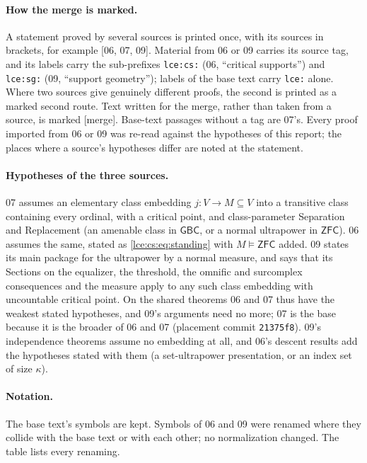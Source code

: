 \documentclass[11pt,letterpaper]{article}
\numberwithin{equation}{section}
\theoremstyle{definition}
\theoremstyle{remark}
\newcommand{\ZFC}{\mathsf{ZFC}}
\newcommand{\GBC}{\mathsf{GBC}}
\newcommand{\src}[1]{\textup{\textsf{\small[#1]}}}%
\newcommand{\mergetag}{\textup{\textsf{\small[merge]}}}%
\begin{document}
\paragraph{How the merge is marked.} A statement proved by several sources is
printed once, with its sources in brackets, for example \src{06, 07, 09}.
Material from 06 or 09 carries its source tag, and its labels carry the
sub-prefixes \texttt{lce:cs:} (06, ``critical supports'') and
\texttt{lce:sg:} (09, ``support geometry''); labels of the base text carry
\texttt{lce:} alone. Where two sources give genuinely different proofs, the
second is printed as a marked second route. Text written for the merge,
rather than taken from a source, is marked \mergetag. Base-text passages
without a tag are 07's. Every proof imported from 06 or 09 was re-read
against the hypotheses of this report; the places where a source's
hypotheses differ are noted at the statement.

\paragraph{Hypotheses of the three sources.} 07 assumes an elementary class
embedding $j:V\to M\subseteq V$ into a transitive class containing every
ordinal, with a critical point, and class-parameter Separation and
Replacement (an amenable class in $\GBC$, or a normal ultrapower in $\ZFC$).
06 assumes the same, stated as \eqref{lce:cs:eq:standing} with $M\models\ZFC$
added. 09 states its main package for the ultrapower by a normal measure,
and says that its Sections on the equalizer, the threshold, the omnific and
surcomplex consequences and the measure apply to any such class embedding
with uncountable critical point. On the shared theorems 06 and 07 thus have
the weakest stated hypotheses, and 09's arguments need no more; 07 is the
base because it is the broader of 06 and 07 (placement commit
\texttt{21375f8}). 09's independence theorems assume no
embedding at all, and 06's descent results add the hypotheses stated with
them (a set-ultrapower presentation, or an index set of size $\kappa$).

\paragraph{Notation.} The base text's symbols are kept. Symbols of 06 and 09
were renamed where they collide with the base text or with each other; no
normalization changed. The table lists every renaming.
\end{document}
